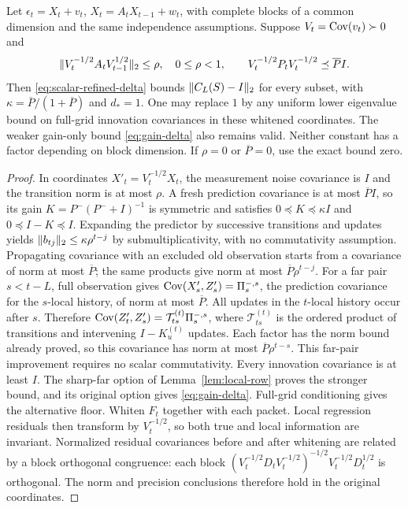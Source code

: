 \begin{theorem}
\label{thm:block-locality}
Let $\epsilon_t=X_t+v_t$, $X_t=A_tX_{t-1}+w_t$, with complete blocks of
a common dimension and the same independence assumptions. Suppose
$V_t=\operatorname{Cov}(v_t)\succ0$ and
\begin{equation}
 \lVert V_t^{-1/2}A_tV_{t-1}^{1/2}\rVert_2\le\rho,\quad 0\le\rho<1,\qquad
 V_t^{-1/2}P_tV_t^{-1/2}\preceq\overline P I.
 \label{eq:block-promises}
\end{equation}
Then \eqref{eq:scalar-refined-delta} bounds $\lVert C_L(S)-I\rVert_2$ for every subset,
with $\kappa=\overline P/(1+\overline P)$ and $d_*=1$.
One may replace $1$ by any uniform lower eigenvalue bound on full-grid
innovation covariances in these whitened coordinates. The weaker gain-only
bound \eqref{eq:gain-delta} also remains valid. Neither constant has a
factor depending on block dimension.
If $\rho=0$ or $\overline P=0$, use the exact bound zero.
\end{theorem}
\begin{proof}
In coordinates $X'_t=V_t^{-1/2}X_t$, the measurement noise covariance is $I$
and the transition norm is at most $\rho$. A fresh prediction covariance
is at most $\overline P I$, so its gain
$K=P^-(P^-+I)^{-1}$ is symmetric and satisfies
$0\preceq K\preceq\kappa I$ and $0\preceq I-K\preceq I$.
Expanding the predictor by successive transitions and updates yields
$\lVert b_{tj}\rVert_2\le\kappa\rho^{t-j}$ by submultiplicativity, with no
commutativity assumption. Propagating covariance with an excluded old
observation starts from a covariance of norm at most $\overline P$;
the same products give norm at most $\overline P\rho^{t-j}$.
For a far pair $s<t-L$, full observation gives
$\operatorname{Cov}(X'_s,Z'_s)=\Pi_s^{-,s}$, the prediction covariance for the
$s$-local history, of norm at most $\overline P$. All updates in the
$t$-local history occur after $s$. Therefore
$\operatorname{Cov}(Z'_t,Z'_s)=\mathcal T_{ts}^{(t)}\Pi_s^{-,s}$, where
$\mathcal T_{ts}^{(t)}$ is the ordered product of transitions and
intervening $I-K_u^{(t)}$ updates. Each factor has the norm bound already
proved, so this covariance has norm at most $\overline P\rho^{t-s}$.
This far-pair improvement requires no scalar commutativity.
Every innovation covariance is at least $I$. The sharp-far option of
Lemma~\ref{lem:local-row} proves the stronger bound, and its original
option gives \eqref{eq:gain-delta}. Full-grid conditioning gives the
alternative floor.
Whiten $F_t$ together with each packet. Local regression residuals then
transform by $V_t^{-1/2}$, so both true and local information are invariant.
Normalized residual covariances before and after whitening are related by
a block orthogonal congruence: each block
$(V_t^{-1/2}D_tV_t^{-1/2})^{-1/2}V_t^{-1/2}D_t^{1/2}$ is orthogonal.
The norm and precision conclusions therefore hold in the original coordinates.
\end{proof}

